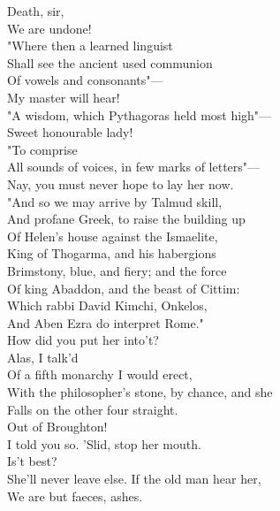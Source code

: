 \documentclass[a4paper,oneside]{memoir}
\begin{document}
\begin{drama*}
\facespeaks {} Death, sir,\\
We are undone!\\
\dolspeaks {} "Where then a learned linguist\\
Shall see the ancient used communion\\
Of vowels and consonants"---\\
\facespeaks {} My master will hear!\\
\dolspeaks "A wisdom, which Pythagoras held most high"---\\
\mammonspeaks Sweet honourable lady!\\
\dolspeaks {} "To comprise\\
All sounds of voices, in few marks of letters"---\\
\facespeaks Nay, you must never hope to lay her now.\\
\dolspeaks "And so we may arrive by Talmud skill,\\
And profane Greek, to raise the building up\\
Of Helen's house against the Ismaelite,\\
King of Thogarma, and his habergions\\
Brimstony, blue, and fiery; and the force\\
Of king Abaddon, and the beast of Cittim:\\
Which rabbi David Kimchi, Onkelos,\\
And Aben Ezra do interpret Rome."\\
\facespeaks How did you put her into't?\\
\mammonspeaks {} Alas, I talk'd\\
Of a fifth monarchy I would erect,\\
With the philosopher's stone, by chance, and she\\
Falls on the other four straight.\\
\facespeaks {} Out of Broughton!\\
I told you so. 'Slid, stop her mouth.\\
\mammonspeaks {} Is't best?\\
\facespeaks She'll never leave else. If the old man hear her,\\
We are but faeces, ashes.\\

\end{drama*}
\end{document}
